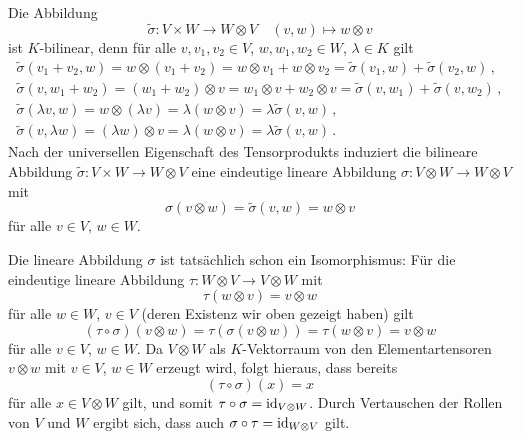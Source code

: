 \begin{example}
\begin{itemize}
      Die Abbildung
      \[
                \tilde{\sigma}
        \colon  V \times W
        \to     W \otimes V
        \quad   (v,w)
        \mapsto w \otimes v
      \]
      ist $K$-bilinear, denn für alle $v, v_1, v_2 \in V$, $w, w_1, w_2 \in W$, $\lambda \in K$ gilt
      \begin{gather*}
          \tilde{\sigma}(v_1 + v_2, w)
        = w \otimes (v_1 + v_2)
        = w \otimes v_1 + w \otimes v_2
        = \tilde{\sigma}(v_1, w) + \tilde{\sigma}(v_2, w) \,,
        \\
          \tilde{\sigma}(v, w_1 + w_2)
        = (w_1 + w_2) \otimes v
        = w_1 \otimes v + w_2 \otimes v
        = \tilde{\sigma}(v, w_1) + \tilde{\sigma}(v, w_2) \,,
        \\
          \tilde{\sigma}(\lambda v, w)
        = w \otimes (\lambda v)
        = \lambda (w \otimes v)
        = \lambda \tilde{\sigma}(v, w) \,,
        \\
          \tilde{\sigma}(v, \lambda w)
        = (\lambda w) \otimes v
        = \lambda (w \otimes v)
        = \lambda \tilde{\sigma}(v, w) \,.
      \end{gather*}
      Nach der universellen Eigenschaft des Tensorprodukts induziert die bilineare Abbildung $\tilde{\sigma} \colon V \times W \to W \otimes V$ eine eindeutige lineare Abbildung $\sigma \colon V \otimes W \to W \otimes V$ mit
      \[
          \sigma(v \otimes w)
        = \tilde{\sigma}(v, w)
        = w \otimes v
      \]
      für alle $v \in V$, $w \in W$.
      
      Die lineare Abbildung $\sigma$ ist tatsächlich schon ein Isomorphismus:
      Für die eindeutige lineare Abbildung $\tau \colon W \otimes V \to V \otimes W$ mit
      \[
          \tau(w \otimes v)
        = v \otimes w
      \]
      für alle $w \in W$, $v \in V$ (deren Existenz wir oben gezeigt haben) gilt
      \[
          (\tau \circ \sigma)(v \otimes w)
        = \tau(\sigma(v \otimes w))
        = \tau(w \otimes v)
        = v \otimes w
      \]
      für alle $v \in V$, $w \in W$.
      Da $V \otimes W$ als $K$-Vektorraum von den Elementartensoren $v \otimes w$ mit $v \in V$, $w \in W$ erzeugt wird, folgt hieraus, dass bereits
      \[
          (\tau \circ \sigma)(x)
        = x
      \]
      für alle $x \in V \otimes W$ gilt, und somit $\tau \circ \sigma = \operatorname{id}_{V \otimes W}$.
      Durch Vertauschen der Rollen von $V$ und $W$ ergibt sich, dass auch $\sigma \circ \tau = \operatorname{id}_{W \otimes V}$ gilt.
  \end{itemize}
\end{example}

